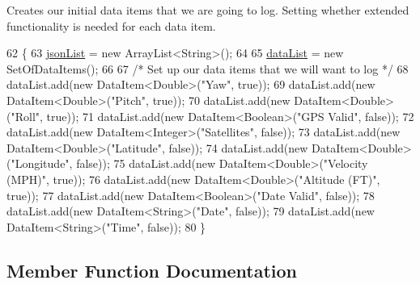 Creates our initial data items that we are going to log. Setting whether extended functionality is needed for each data item. 
\begin{DoxyCode}
62                               \{
63         \hyperlink{class_android_app_1_1_realtime_fragment_a4c3f12bcaaab715dc512d4cd4a4c11cf}{jsonList} = \textcolor{keyword}{new} ArrayList<String>();
64 
65         \hyperlink{class_android_app_1_1_realtime_fragment_ab1c4983b61e50b501ed22842253bf849}{dataList} = \textcolor{keyword}{new} SetOfDataItems();
66 
67         \textcolor{comment}{/* Set up our data items that we will want to log */}
68         dataList.add(\textcolor{keyword}{new} DataItem<Double>(\textcolor{stringliteral}{"Yaw"}, \textcolor{keyword}{true}));
69         dataList.add(\textcolor{keyword}{new} DataItem<Double>(\textcolor{stringliteral}{"Pitch"}, \textcolor{keyword}{true}));
70         dataList.add(\textcolor{keyword}{new} DataItem<Double>(\textcolor{stringliteral}{"Roll"}, \textcolor{keyword}{true}));
71         dataList.add(\textcolor{keyword}{new} DataItem<Boolean>(\textcolor{stringliteral}{"GPS Valid"}, \textcolor{keyword}{false}));
72         dataList.add(\textcolor{keyword}{new} DataItem<Integer>(\textcolor{stringliteral}{"Satellites"}, \textcolor{keyword}{false}));
73         dataList.add(\textcolor{keyword}{new} DataItem<Double>(\textcolor{stringliteral}{"Latitude"}, \textcolor{keyword}{false}));
74         dataList.add(\textcolor{keyword}{new} DataItem<Double>(\textcolor{stringliteral}{"Longitude"}, \textcolor{keyword}{false}));
75         dataList.add(\textcolor{keyword}{new} DataItem<Double>(\textcolor{stringliteral}{"Velocity (MPH)"}, \textcolor{keyword}{true}));
76         dataList.add(\textcolor{keyword}{new} DataItem<Double>(\textcolor{stringliteral}{"Altitude (FT)"}, \textcolor{keyword}{true}));
77         dataList.add(\textcolor{keyword}{new} DataItem<Boolean>(\textcolor{stringliteral}{"Date Valid"}, \textcolor{keyword}{false}));
78         dataList.add(\textcolor{keyword}{new} DataItem<String>(\textcolor{stringliteral}{"Date"}, \textcolor{keyword}{false}));
79         dataList.add(\textcolor{keyword}{new} DataItem<String>(\textcolor{stringliteral}{"Time"}, \textcolor{keyword}{false}));
80     \}
\end{DoxyCode}


\subsection{Member Function Documentation}
\mbox{\label{class_android_app_1_1_realtime_fragment_a9efde75b84b4566f528b5cd53c908917}} 
